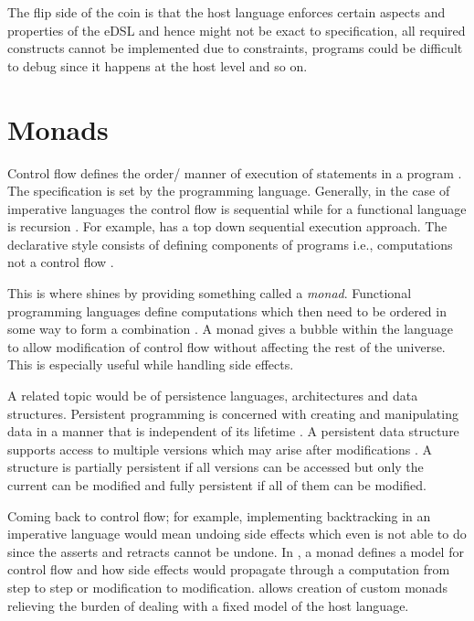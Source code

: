 \documentclass[thesis-solanki.tex]{subfiles}
\begin{document}
  The flip side of the coin is that the host language enforces certain aspects and properties of the eDSL and hence
  might not be exact to specification, all required constructs cannot be implemented due to constraints, programs
  could be difficult to debug since it happens at the host level and so on.


\section{Monads}
Control flow defines the order/ manner of execution of statements in a pro\-gram \cite{website:controlflowwiki}.
The specification is set by the programming language.
Generally, in the case of imperative languages the control flow is sequential while for a functional language is
recursion \cite{website:controlflowdalhousie}.
For example,  has a top down sequential execution approach.
The declarative style consists of defining components of programs i.e.,
computations not a control flow \cite{website:declarativeprogrammingwiki}.

This is where  shines by providing something called a \textit{monad}.
Functional programming languages
define computations which then need to be ordered in some way to form a
combination \cite{website:monadascomputation}.
A monad gives a bubble within the language to allow modification of control flow without affecting the rest of the
universe.
This is especially useful while handling side effects.

A related topic would be of persistence languages, architectures and data structures.
Persistent programming is concerned with creating and manipulating data in a manner that is independent of its
lifetime \cite{morrison1990persistent}.
A persistent data structure supports access to multiple versions which may arise after modifications
\cite{driscoll1986making, website:persistentdatastructuresmit}.
A structure is partially persistent if all versions can be accessed but only the current can be modified and fully
persistent if all of them can be modified.

Coming back to control flow; for example, implementing backtracking in an imperative language would mean undoing
side effects which even  is not able to do since the asserts and retracts cannot be undone.
In , a monad defines a model for control flow and how side effects would propagate through a
computation from step to step or modification to modification.
 allows creation of custom monads relieving the burden of dealing with a fixed model of the
host language.
\end{document}
